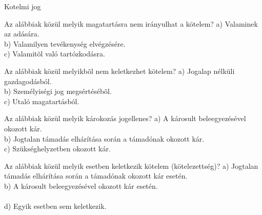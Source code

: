 \begin{frame}[plain]
\begin{tcolorbox}[center, colback={myyellow}, coltext={black}, colframe={myyellow}]
    { Kotelmi jog}\\
\end{tcolorbox}
\end{frame}

\begin{frame}

\begin{tcolorbox}[title={130. Kérdés}]
Az alábbiak közül melyik magatartásra nem irányulhat a kötelem?
\tcblower
a) Valaminek az adására.\\
b) Valamilyen tevékenység elvégzésére.\\
c) Valamitõl való tartózkodásra.\\
\end{tcolorbox}

\begin{tcolorbox}[title={131. Kérdés}]
Az alábbiak közül melyikbõl nem keletkezhet kötelem?
\tcblower
a) Jogalap nélküli gazdagodásból.\\
b) Személyiségi jog megsértésébõl.\\
c) Utaló magatartásból.\\
\end{tcolorbox}

\begin{tcolorbox}[title={132. Kérdés}]
Az alábbiak közül melyik károkozás jogellenes?
\tcblower
a) A károsult beleegyezésével okozott kár.\\
b) Jogtalan támadás elhárítása során a támadónak okozott kár.\\
c) Szükséghelyzetben okozott kár.\\
\end{tcolorbox}

\begin{tcolorbox}[title={133. Kérdés}]
Az alábbiak közül melyik esetben keletkezik kötelem (kötelezettség)?
\tcblower
a) Jogtalan támadás elhárítása során a támadónak okozott kár esetén.\\
b) A károsult beleegyezésével okozott kár esetén.\\
\\
d) Egyik esetben sem keletkezik.
\end{tcolorbox}

\end{frame}


